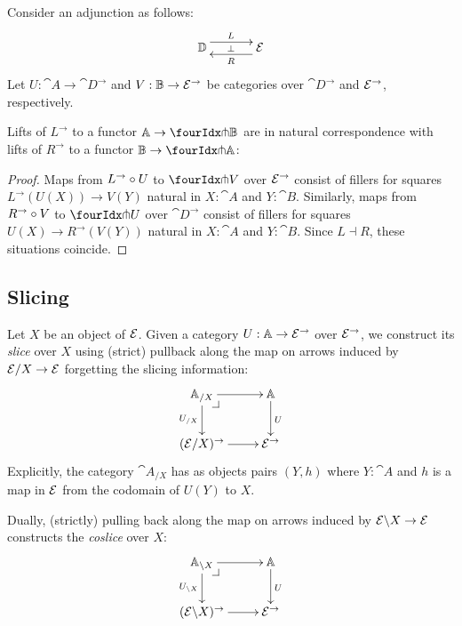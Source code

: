 \documentclass[reqno,10pt,a4paper,oneside]{amsart}
\begin{document}
Consider an adjunction as follows:
\[
\xymatrix@C+1em{
  \cat{D}
  \ar@<5pt>[r]^{L}
  \ar@{}[r]|{\bot}
&
  \catE
  \ar@<5pt>[l]^{R}
}
\]
Let $U : \cat{A} \to \cat{D}^{\to}$ and $V : \mathbb{B} \to \mathcal{E}^{\to}$ be categories over $\cat{D}^{\to}$ and $\mathcal{E}^{\to}$, respectively.

\begin{lemma}
\label{lift-of-adjunction}
Lifts of $L^{\to}$ to a functor $\cat{A} \to \liftl{\cat{B}}$ are in natural correspondence with lifts of $R^{\to}$ to a functor $\cat{B} \to \liftr{\cat{A}}$:
\end{lemma}

\begin{proof}
Maps from $L^{\to} \mathbin{\circ} U$ to $\liftl{V}$ over $\mathcal{E}^{\to}$ consist of fillers for squares $L^{\to}(U(X)) \to V(Y)$ natural in $X : \cat{A}$ and $Y : \cat{B}$.
Similarly, maps from $R^{\to} \mathbin{\circ} V$ to $\liftr{U}$ over $\cat{D}^{\to}$ consist of fillers for squares $U(X) \to R^{\to}(V(Y))$ natural in $X : \cat{A}$ and $Y : \cat{B}$.
Since $L \dashv R$, these situations coincide.
\end{proof}

\subsection{Slicing}

Let $X$ be an object of $\mathcal{E}$.
Given a category $U : \mathbb{A} \to \mathcal{E}^{\to}$ over $\mathcal{E}^{\to}$, we construct its \emph{slice} over $X$ using (strict) pullback along the map on arrows induced by $\mathcal{E}/X \to \mathcal{E}$ forgetting the slicing information:
\[
\xymatrix{
  \cat{A}_{/X}
  \ar[r]
  \ar[d]_{U_{/X}}
  \pullback{dr}
&
  \cat{A}
  \ar[d]^{U}
\\
  (\catE/X)^{\to}
  \ar[r]
&
  \catE^{\to}
}
\]
Explicitly, the category $\cat{A}_{/X}$ has as objects pairs $(Y, h)$ where $Y : \cat{A}$ and $h$ is a map in $\mathcal{E}$ from the codomain of $U(Y)$ to $X$.

Dually, (strictly) pulling back along the map on arrows induced by $\mathcal{E} \backslash X \to \mathcal{E}$ constructs the \emph{coslice} over $X$:
\[
\xymatrix{
  \cat{A}_{\backslash X}
  \ar[r]
  \ar[d]_{U_{\backslash X}}
  \pullback{dr}
&
  \cat{A}
  \ar[d]^{U}
\\
  (\catE \backslash X)^{\to}
  \ar[r]
&
  \catE^{\to}
}
\]
\end{document}
